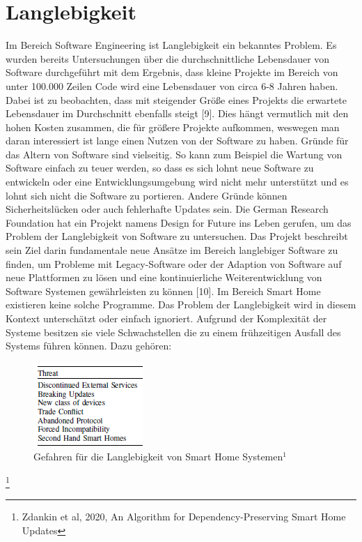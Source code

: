 \section{Langlebigkeit}
Im Bereich Software Engineering ist Langlebigkeit ein bekanntes Problem. Es wurden bereits Untersuchungen über die durchschnittliche 
Lebensdauer von Software durchgeführt mit dem Ergebnis, dass kleine Projekte im Bereich von unter 100.000 Zeilen Code wird eine Lebensdauer von circa 
6-8 Jahren haben. Dabei ist zu beobachten, dass mit steigender Größe eines Projekts die erwartete Lebensdauer im Durchschnitt
ebenfalls steigt [9]. Dies hängt vermutlich mit den hohen Kosten zusammen, die für größere Projekte aufkommen, weswegen man daran
interessiert ist lange einen Nutzen von der Software zu haben. Gründe für das Altern von Software sind vielseitig. So kann zum Beispiel 
die Wartung von Software einfach zu teuer werden, so dass es sich lohnt neue Software zu entwickeln oder eine Entwicklungsumgebung wird
nicht mehr unterstützt und es lohnt sich nicht die Software zu portieren. Andere Gründe können Sicherheitslücken oder auch fehlerhafte 
Updates sein. Die German Research Foundation hat ein Projekt namens Design for Future ins Leben gerufen, um das Problem der Langlebigkeit
von Software zu untersuchen. Das Projekt beschreibt sein Ziel darin fundamentale neue Ansätze im Bereich langlebiger Software zu finden, um Probleme mit Legacy-Software
oder der Adaption von Software auf neue Plattformen zu lösen und eine kontinuierliche Weiterentwicklung von Software Systemen gewährleisten 
zu können [10].
Im Bereich Smart Home existieren keine solche Programme. Das Problem der Langlebigkeit wird in diesem Kontext unterschätzt oder einfach ignoriert.
Aufgrund der Komplexität der Systeme besitzen sie viele Schwachstellen die zu einem frühzeitigen Ausfall des Systems führen können. Dazu gehören:

\begin{figure}[h]
\centering
\includegraphics{"Threats"}
\caption{Gefahren für die Langlebigkeit von Smart Home Systemen\( ^1\) }
\label{fig:Prob1:MEA}
\end{figure}
\footnote{Zdankin et al, 2020, An Algorithm for Dependency-Preserving Smart Home Updates}


